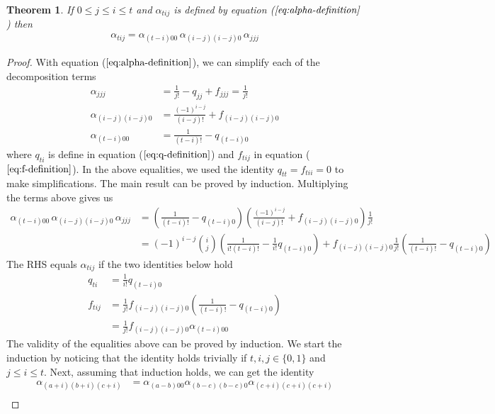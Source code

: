 \documentclass{article}
\newtheorem{theorem}{Theorem}
\begin{document}
\begin{theorem}
\label{theorem:alpha-decomposition}
If $0 \le j \le i \le t$ and $\alpha_{tij}$ is defined by equation ($\textit{\ref{eq:alpha-definition}}$) then
\begin{align}
\alpha_{tij} = \alpha_{(t-i)00} \, \alpha_{(i-j)(i-j)0} \, \alpha_{jjj}
\end{align}
\end{theorem}
\begin{proof}
With equation ($\ref{eq:alpha-definition}$), we can simplify each of the decomposition terms
\begin{align}
    \alpha_{jjj} &= \frac{1}{j!} - q_{jj} + f_{jjj} = \frac{1}{j!} \\
    \alpha_{(i-j)(i-j)0} &= \frac{(-1)^{i-j}}{(i-j)!} + f_{(i-j)(i-j)0} \label{eq:alpha-ii0} \\
    \alpha_{(t-i)00} &= \frac{1}{(t-i)!}-q_{(t-i)0}
\end{align}
where $q_{ti}$ is define in equation ($\ref{eq:q-definition}$) and $f_{tij}$ in equation ($\ref{eq:f-definition}$). In the above equalities, we used the identity $q_{tt} = f_{tii} = 0$ to make simplifications. The main result can be proved by induction. Multiplying the terms above gives us
\begin{align*}
\alpha_{(t-i)00} \, \alpha_{(i-j)(i-j)0} \, \alpha_{jjj}
&=
  \left(\frac{1}{(t-i)!}-q_{(t-i)0}\right)
  \left(\frac{(-1)^{i-j}}{(i-j)!} + f_{(i-j)(i-j)0}\right)
  \frac{1}{j!} \\
&= 
  (-1)^{i-j}
  \binom{i}{j}
  \left(\frac{1}{i!(t-i)!}-\frac{1}{i!}q_{(t-i)0}\right)
  + 
  f_{(i-j)(i-j)0}
  \frac{1}{j!}
  \left(\frac{1}{(t-i)!}-q_{(t-i)0}\right)
\end{align*}
The RHS equals $\alpha_{tij}$ if the two identities below hold
\begin{align*}
q_{ti}
&= \frac{1}{i!}q_{(t-i)0} \\
f_{tij}
&= 
    \frac{1}{j!}
    f_{(i-j)(i-j)0}
    \left(\frac{1}{(t-i)!}-q_{(t-i)0}\right) \\
&= 
    \frac{1}{j!}
    f_{(i-j)(i-j)0}
    \alpha_{(t-i)00}
\end{align*}
The validity of the equalities above can be proved by induction. We start the induction by noticing that the identity holds trivially if $t, i, j \in \{0, 1\}$ and $j \le i \le t$. Next, assuming that induction holds, we can get the identity
\begin{align*}
\alpha_{(a+i)(b+i)(c+i)}
&= \alpha_{(a-b)00}\alpha_{(b-c)(b-c)0}\alpha_{(c+i)(c+i)(c+i)} \\

\end{align*}
\end{proof}
\end{document}
